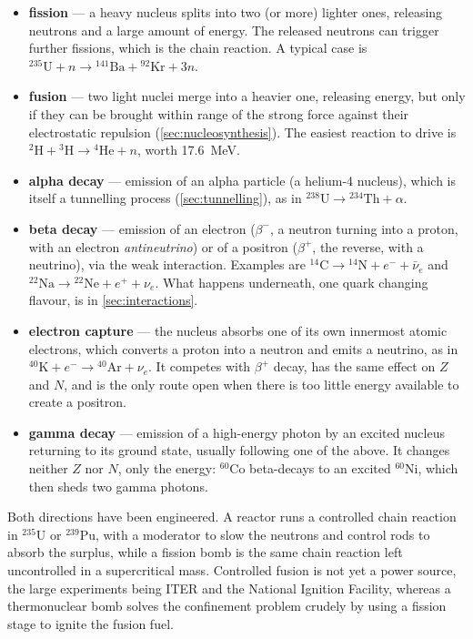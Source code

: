         \begin{itemize}
            \item \textbf{fission} --- a heavy nucleus splits into two (or more) lighter ones, releasing neutrons and a large amount of energy. The released neutrons can trigger further fissions, which is the chain reaction. A typical case is ${}^{235}\mathrm{U} + n \rightarrow {}^{141}\mathrm{Ba} + {}^{92}\mathrm{Kr} + 3n$.
            \item \textbf{fusion} --- two light nuclei merge into a heavier one, releasing energy, but only if they can be brought within range of the strong force against their electrostatic repulsion (\cref{sec:nucleosynthesis}). The easiest reaction to drive is ${}^{2}\mathrm{H} + {}^{3}\mathrm{H} \rightarrow {}^{4}\mathrm{He} + n$, worth \qty{17.6}{\mega\electronvolt}.
            \item \textbf{alpha decay} --- emission of an alpha particle (a helium-4 nucleus), which is itself a tunnelling process (\cref{sec:tunnelling}), as in ${}^{238}\mathrm{U} \rightarrow {}^{234}\mathrm{Th} + \alpha$.
            \item \textbf{beta decay} --- emission of an electron ($\beta^{-}$, a neutron turning into a proton, with an electron \emph{antineutrino}) or of a positron ($\beta^{+}$, the reverse, with a neutrino), via the weak interaction. Examples are ${}^{14}\mathrm{C} \rightarrow {}^{14}\mathrm{N} + e^{-} + \bar{\nu}_{e}$ and ${}^{22}\mathrm{Na} \rightarrow {}^{22}\mathrm{Ne} + e^{+} + \nu_{e}$. What happens underneath, one quark changing flavour, is in \cref{sec:interactions}.
            \item \textbf{electron capture} --- the nucleus absorbs one of its own innermost atomic electrons, which converts a proton into a neutron and emits a neutrino, as in ${}^{40}\mathrm{K} + e^{-} \rightarrow {}^{40}\mathrm{Ar} + \nu_{e}$. It competes with $\beta^{+}$ decay, has the same effect on $Z$ and $N$, and is the only route open when there is too little energy available to create a positron.
            \item \textbf{gamma decay} --- emission of a high-energy photon by an excited nucleus returning to its ground state, usually following one of the above. It changes neither $Z$ nor $N$, only the energy: ${}^{60}\mathrm{Co}$ beta-decays to an excited ${}^{60}\mathrm{Ni}$, which then sheds two gamma photons.
        \end{itemize}

        Both directions have been engineered. A reactor runs a controlled chain reaction in ${}^{235}$U or ${}^{239}$Pu, with a moderator to slow the neutrons and control rods to absorb the surplus, while a fission bomb is the same chain reaction left uncontrolled in a supercritical mass. Controlled fusion is not yet a power source, the large experiments being ITER and the National Ignition Facility, whereas a thermonuclear bomb solves the confinement problem crudely by using a fission stage to ignite the fusion fuel.

